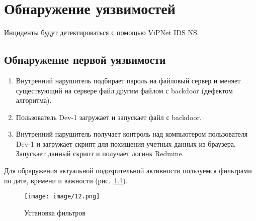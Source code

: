 \documentclass[
  12pt,
  a4paper,
  DIV=11,
  numbers=noendperiod]{scrreprt}
\author{}
\date{}
\providecommand{\tightlist}{%
  \setlength{\itemsep}{0pt}\setlength{\parskip}{0pt}}\usepackage{longtable,booktabs,array}
\renewcommand*\contentsname{Содержание}
\newcommand\contentsname{Содержание}
\begin{document}
\ifdefined\Shaded\renewenvironment{Shaded}{\begin{tcolorbox}[enhanced, interior hidden, breakable, sharp corners, borderline west={3pt}{0pt}{shadecolor}, frame hidden, boxrule=0pt]}{\end{tcolorbox}}\fi

\renewcommand*\contentsname{Содержание}
{
\setcounter{tocdepth}{1}
\tableofcontents
}
\listoffigures
\listoftables
{}
\hypertarget{ux43eux431ux43dux430ux440ux443ux436ux435ux43dux438ux435-ux443ux44fux437ux432ux438ux43cux43eux441ux442ux435ux439}{%
\chapter{Обнаружение
уязвимостей}\label{ux43eux431ux43dux430ux440ux443ux436ux435ux43dux438ux435-ux443ux44fux437ux432ux438ux43cux43eux441ux442ux435ux439}}

Инциденты будут детектироваться с помощью ViPNet IDS NS.

\hypertarget{ux43eux431ux43dux430ux440ux443ux436ux435ux43dux438ux435-ux43fux435ux440ux432ux43eux439-ux443ux44fux437ux432ux438ux43cux43eux441ux442ux438}{%
\section{Обнаружение первой
уязвимости}\label{ux43eux431ux43dux430ux440ux443ux436ux435ux43dux438ux435-ux43fux435ux440ux432ux43eux439-ux443ux44fux437ux432ux438ux43cux43eux441ux442ux438}}

\begin{enumerate}
\def\labelenumi{\arabic{enumi}.}
\tightlist
\item
  Внутренний нарушитель подбирает пароль на файловый сервер и меняет
  существующий на сервере файл другим файлом с backdoor (дефектом
  алгоритма).
\item
  Пользователь Dev-1 загружает и запускает файл с backdoor.
\item
  Внутренний нарушитель получает контроль над компьютером пользователя
  Dev-1 и загружает скрипт для похищения учетных данных из браузера.
  Запускает данный скрипт и получает логин к Redmine.
\end{enumerate}

Для обраружения актуальной подозрительной активности пользуемся
фильтрами по дате, времени и важности (рис.~\ref{fig-012}).

\begin{figure}

{\centering \texttt{[image: image/12.png]}

}

\caption{\label{fig-012}Установка фильтров}

\end{figure}
\end{document}
